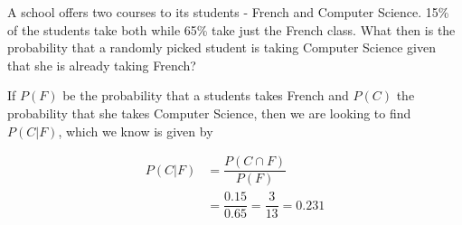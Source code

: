 
%
%
%
%
% 
% 

\question A school offers two courses to its students - French and Computer Science. 
15\% of the students take both while 65\% take just the French class. What then is
the probability that a randomly picked student is taking Computer Science given
that she is already taking French?

\insertQR{}

\ifprintanswers
\fi 

\begin{solution}
   If $P(F)$ be the probability that a students takes French and $P(C)$ the 
   probability that she takes Computer Science, then we are looking to find 
   $P(C \vert F)$, which we know is given by
   
   \begin{align}
      P(C \vert F) &= \dfrac{P(C \cap F)}{P(F)} \\
                   &= \dfrac{0.15}{0.65} = \dfrac{3}{13} = 0.231
   \end{align}
\end{solution}
